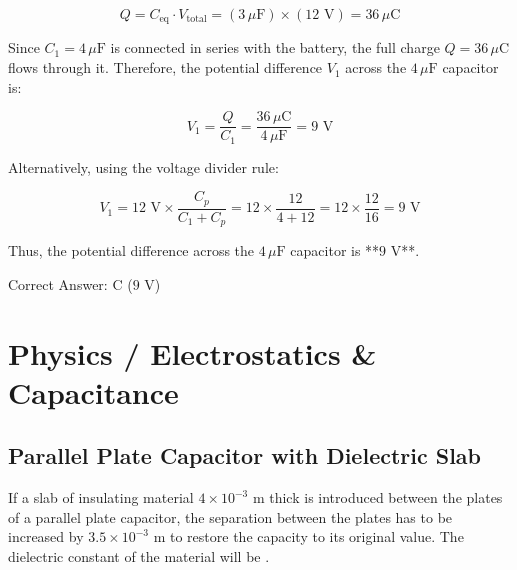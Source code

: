 \begin{solution}
$$Q = C_{\text{eq}} \cdot V_{\text{total}} = (3\,\mu\text{F}) \times (12\text{ V}) = 36\,\mu\text{C}$$

Since $C_1 = 4\,\mu\text{F}$ is connected in series with the battery, the full charge $Q = 36\,\mu\text{C}$ flows through it. Therefore, the potential difference $V_1$ across the $4\,\mu\text{F}$ capacitor is:

$$V_1 = \frac{Q}{C_1} = \frac{36\,\mu\text{C}}{4\,\mu\text{F}} = 9\text{ V}$$

Alternatively, using the voltage divider rule:

$$V_1 = 12\text{ V} \times \frac{C_p}{C_1 + C_p} = 12 \times \frac{12}{4 + 12} = 12 \times \frac{12}{16} = 9\text{ V}$$

Thus, the potential difference across the $4\,\mu\text{F}$ capacitor is **$9\text{ V}$**.

Correct Answer: C ($9\text{ V}$)
\end{solution}

\clearpage

\section{Physics / Electrostatics \& Capacitance}


\subsection{Parallel Plate Capacitor with Dielectric Slab}


If a slab of insulating material $4 \times 10^{-3}\text{ m}$ thick is introduced between the plates of a parallel plate capacitor, the separation between the plates has to be increased by $3.5 \times 10^{-3}\text{ m}$ to restore the capacity to its original value. The dielectric constant of the material will be \underline{\hspace{2cm}}.

